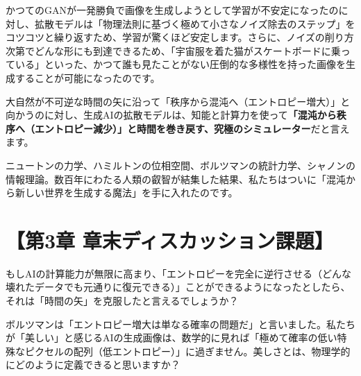 かつてのGANが一発勝負で画像を生成しようとして学習が不安定になったのに対し、拡散モデルは「物理法則に基づく極めて小さなノイズ除去のステップ」をコツコツと繰り返すため、学習が驚くほど安定します。さらに、ノイズの削り方次第でどんな形にも到達できるため、「宇宙服を着た猫がスケートボードに乗っている」といった、かつて誰も見たことがない圧倒的な多様性を持った画像を生成することが可能になったのです。

大自然が不可逆な時間の矢に沿って「秩序から混沌へ（エントロピー増大）」と向かうのに対し、生成AIの拡散モデルは、知能と計算力を使って\textbf{「混沌から秩序へ（エントロピー減少）」と時間を巻き戻す、究極のシミュレーター}だと言えます。

ニュートンの力学、ハミルトンの位相空間、ボルツマンの統計力学、シャノンの情報理論。数百年にわたる人類の叡智が結集した結果、私たちはついに「混沌から新しい世界を生成する魔法」を手に入れたのです。

\section*{【第3章 章末ディスカッション課題】}

もしAIの計算能力が無限に高まり、「エントロピーを完全に逆行させる（どんな壊れたデータでも元通りに復元できる）」ことができるようになったとしたら、それは「時間の矢」を克服したと言えるでしょうか？

ボルツマンは「エントロピー増大は単なる確率の問題だ」と言いました。私たちが「美しい」と感じるAIの生成画像は、数学的に見れば「極めて確率の低い特殊なピクセルの配列（低エントロピー）」に過ぎません。美しさとは、物理学的にどのように定義できると思いますか？




